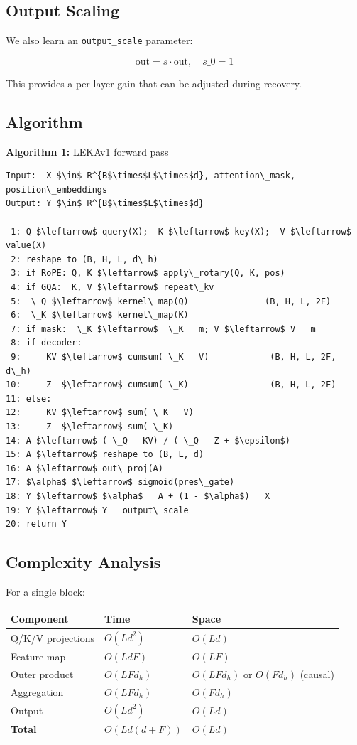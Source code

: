 \subsection{Output Scaling}

We also learn an \texttt{output\_scale} parameter:

\[
\text{out} = s \cdot \text{out}, \quad s\_0 = 1
\tag{4.15}
\]

This provides a per-layer gain that can be adjusted during recovery.

\subsection{Algorithm}

\textbf{Algorithm 1:} LEKAv1 forward pass
\begin{lstlisting}
Input:  X $\in$ R^{B$\times$L$\times$d}, attention\_mask, position\_embeddings
Output: Y $\in$ R^{B$\times$L$\times$d}

 1: Q $\leftarrow$ query(X);  K $\leftarrow$ key(X);  V $\leftarrow$ value(X)
 2: reshape to (B, H, L, d\_h)
 3: if RoPE: Q, K $\leftarrow$ apply\_rotary(Q, K, pos)
 4: if GQA:  K, V $\leftarrow$ repeat\_kv
 5:  \_Q $\leftarrow$ kernel\_map(Q)               (B, H, L, 2F)
 6:  \_K $\leftarrow$ kernel\_map(K)
 7: if mask:  \_K $\leftarrow$  \_K   m; V $\leftarrow$ V   m
 8: if decoder:
 9:     KV $\leftarrow$ cumsum( \_K   V)            (B, H, L, 2F, d\_h)
10:     Z  $\leftarrow$ cumsum( \_K)                (B, H, L, 2F)
11: else:
12:     KV $\leftarrow$ sum( \_K   V)
13:     Z  $\leftarrow$ sum( \_K)
14: A $\leftarrow$ ( \_Q   KV) / ( \_Q   Z + $\epsilon$)
15: A $\leftarrow$ reshape to (B, L, d)
16: A $\leftarrow$ out\_proj(A)
17: $\alpha$ $\leftarrow$ sigmoid(pres\_gate)
18: Y $\leftarrow$ $\alpha$   A + (1 - $\alpha$)   X
19: Y $\leftarrow$ Y   output\_scale
20: return Y
\end{lstlisting}

\subsection{Complexity Analysis}

For a single block:

\begin{table}[H]
\centering
\small
\begin{tabular}{lll}
\toprule
\textbf{Component} & \textbf{Time} & \textbf{Space} \\
\midrule
Q/K/V projections & $O(L d^2)$ & $O(L d)$ \\
Feature map & $O(L d F)$ & $O(L F)$ \\
Outer product & $O(L F d_h)$ & $O(L F d_h)$ or $O(F d_h)$ (causal) \\
Aggregation & $O(L F d_h)$ & $O(F d_h)$ \\
Output & $O(L d^2)$ & $O(L d)$ \\
\textbf{Total} & $O(L d (d + F))$ & $O(L d)$ \\
\bottomrule
\end{tabular}
\end{table}

